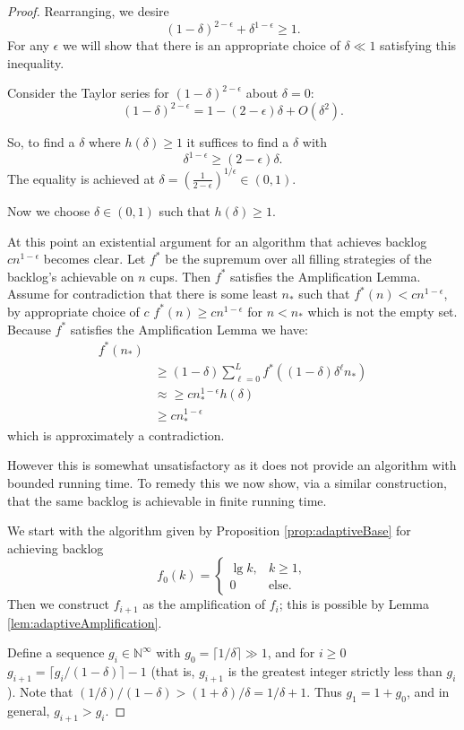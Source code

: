 \documentclass[twocolumn]{article}[11pt]
\begin{document}
\begin{proof}
  Rearranging, we desire $$(1-\delta)^{2-\epsilon} + \delta^{1-\epsilon}\ge 1.$$
  For any $\epsilon$ we will show that there is an appropriate choice of
  $\delta\ll 1$ satisfying this inequality.

  Consider the Taylor series for $(1-\delta)^{2-\epsilon}$ about $\delta = 0$:
  $$(1-\delta)^{2-\epsilon} = 1 - (2-\epsilon)\delta + O(\delta^2).$$
 
  So, to find a $\delta$ where $h(\delta) \ge 1$ it suffices to find a $\delta$ with 
  $$\delta^{1-\epsilon} \ge (2-\epsilon)\delta.$$
  The equality is achieved at $\delta = (\frac{1}{2-\epsilon})^{1/\epsilon} \in (0,1)$.

  Now we choose $\delta \in (0,1)$ such that $h(\delta)\ge 1$.

  At this point an existential argument for an algorithm that achieves backlog $c n^{1-\epsilon}$ becomes clear. 
  Let $f^*$ be the supremum over all filling strategies of the backlog's achievable on $n$ cups. Then $f^*$ satisfies the Amplification Lemma. Assume for contradiction that there is some least $n_*$ such that $f^*(n) < cn^{1-\epsilon}$, by appropriate choice of $c$ $f^*(n) \ge cn^{1-\epsilon}$ for $n < n_*$ which is not the empty set. Because $f^*$ satisfies the Amplification Lemma we have:
\begin{align*}
  f^*(n_*) & \\
           &\ge (1-\delta)\sum_{\ell=0}^L f^*((1-\delta)\delta^\ell n_*) \\
           &\approx \ge cn_*^{1-\epsilon} h(\delta)\\
           &\ge cn_*^{1-\epsilon}
\end{align*}
which is {\color{red}approximately} a contradiction.

However this is somewhat unsatisfactory as it does not provide an algorithm with bounded running time.
To remedy this we now show, via a similar construction, that the same backlog is achievable in finite running time.

  We start with the algorithm given by Proposition \ref{prop:adaptiveBase} for
  achieving backlog
  $$f_0(k) = 
  \begin{cases} 
    \lg k, & k\geq 1, \\
    0 & \text{else.}
  \end{cases}$$
  Then we construct $f_{i+1}$ as the amplification of $f_{i}$; this is possible
  by Lemma \ref{lem:adaptiveAmplification}. 

  Define a sequence $g_i \in \mathbb{N}^\infty$ with $g_0 = \lceil 1/\delta
  \rceil \gg 1$, and for $i\ge0$ $g_{i+1} =\lceil g_i/(1-\delta)\rceil -1$
  (that is, $g_{i+1}$ is the greatest integer strictly less than $g_i$).
  Note that $ (1/\delta) / (1-\delta) > (1+\delta)/\delta = 1/\delta + 1.$
  Thus $g_1 = 1+ g_0$, and in general, $g_{i+1} > g_i$.


\end{proof}
\end{document}
